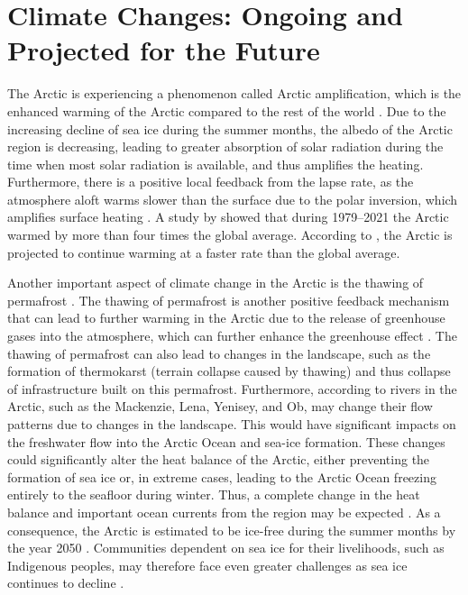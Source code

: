\section{Climate Changes: Ongoing and Projected for the Future}
The Arctic is experiencing a phenomenon called Arctic amplification, which is the enhanced warming of the Arctic compared to the rest of the world \citep{serreze2014}. Due to the increasing decline of sea ice during the summer months, the albedo of the Arctic region is decreasing, leading to greater absorption of solar radiation during the time when most solar radiation is available, and thus amplifies the heating. Furthermore, there is a positive local feedback from the lapse rate, as the atmosphere aloft warms slower than the surface due to the polar inversion, which amplifies surface heating \citep{robyn2021}. A study by \citet{rantanen2022} showed that during 1979--2021 the Arctic warmed by more than four times the global average. According to \citet{IPCC2023}, the Arctic is projected to continue warming at a faster rate than the global average. 

Another important aspect of climate change in the Arctic is the thawing of permafrost \citep{serreze2014}. The thawing of permafrost is another positive feedback mechanism that can lead to further warming in the Arctic due to the release of greenhouse gases into the atmosphere, which can further enhance the greenhouse effect \citep{IPCC2023}. The thawing of permafrost can also lead to changes in the landscape, such as the formation of thermokarst (terrain collapse caused by thawing) and thus collapse of infrastructure built on this permafrost. Furthermore, according to \citet{serreze2014} rivers in the Arctic, such as the Mackenzie, Lena, Yenisey, and Ob, may change their flow patterns due to changes in the landscape. This would have significant impacts on the freshwater flow into the Arctic Ocean and sea-ice formation. These changes could significantly alter the heat balance of the Arctic, either preventing the formation of sea ice or, in extreme cases, leading to the Arctic Ocean freezing entirely to the seafloor during winter. Thus, a complete change in the heat balance and important ocean currents from the region may be expected \citep{hartmann2016}. As a consequence, the Arctic is estimated to be ice-free during the summer months by the year 2050 \citep{hartmann2016}. Communities dependent on sea ice for their livelihoods, such as Indigenous peoples, may therefore face even greater challenges as sea ice continues to decline \citep{IPCC2023}.
